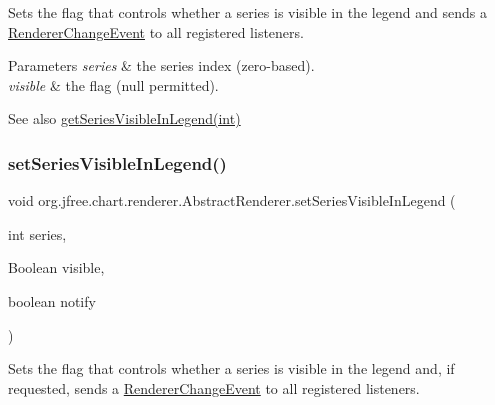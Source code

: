 Sets the flag that controls whether a series is visible in the legend and sends a \mbox{\hyperlink{}{Renderer\+Change\+Event}} to all registered listeners.


\begin{DoxyParams}{Parameters}
{\em series} & the series index (zero-\/based). \\
\hline
{\em visible} & the flag ({\ttfamily null} permitted).\\
\hline
\end{DoxyParams}
\begin{DoxySeeAlso}{See also}
\mbox{\hyperlink{classorg_1_1jfree_1_1chart_1_1renderer_1_1_abstract_renderer_aad277f984aba334ec761085b48ace9f5}{get\+Series\+Visible\+In\+Legend(int)}} 
\end{DoxySeeAlso}
\mbox{\label{classorg_1_1jfree_1_1chart_1_1renderer_1_1_abstract_renderer_a8b13a734cdc2f81e3fc0d3fe019baf78}} 
\subsubsection{\texorpdfstring{set\+Series\+Visible\+In\+Legend()}{setSeriesVisibleInLegend()}\hspace{0.1cm}{\footnotesize\ttfamily [2/4]}}
{\footnotesize\ttfamily void org.\+jfree.\+chart.\+renderer.\+Abstract\+Renderer.\+set\+Series\+Visible\+In\+Legend (\begin{DoxyParamCaption}\item[{int}]{series,  }\item[{Boolean}]{visible,  }\item[{boolean}]{notify }\end{DoxyParamCaption})}

Sets the flag that controls whether a series is visible in the legend and, if requested, sends a \mbox{\hyperlink{}{Renderer\+Change\+Event}} to all registered listeners.


